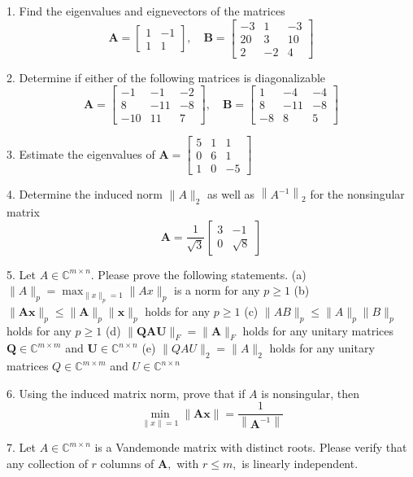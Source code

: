 \documentclass[a4paper,12pt,twoside]{ctexart}
\begin{document}
1. Find the eigenvalues and eignevectors of the matrices
$$
\bm{A}=\left[\begin{array}{cc}
1 & -1 \\
1 & 1
\end{array}\right], \quad \bm{B}=\left[\begin{array}{ccc}
-3 & 1 & -3 \\
20 & 3 & 10 \\
2 & -2 & 4
\end{array}\right]
$$

2. Determine if either of the following matrices is diagonalizable
$$
\bm{A}=\left[\begin{array}{ccc}
-1 & -1 & -2 \\
8 & -11 & -8 \\
-10 & 11 & 7
\end{array}\right], \quad \bm{B}=\left[\begin{array}{ccc}
1 & -4 & -4 \\
8 & -11 & -8 \\
-8 & 8 & 5
\end{array}\right]
$$

3. Estimate the eigenvalues of $\bm{A}=\left[\begin{array}{ccc}5 & 1 & 1 \\ 0 & 6 & 1 \\ 1 & 0 & -5\end{array}\right]$

4. Determine the induced norm $\|A\|_{2}$ as well as $\left\|A^{-1}\right\|_{2}$ for the nonsingular matrix
$$
\bm{A}=\frac{1}{\sqrt{3}}\left[\begin{array}{ll}
3 & -1 \\
0 & \sqrt{8}
\end{array}\right]
$$

5. Let $A \in \mathbb{C}^{m \times n}$. Please prove the following statements.
(a) $\|A\|_{p}=\max _{\|x\|_{p}=1}\|A x\|_{p}$ is a norm for any $p \geq 1$
(b) $\|\bm{A} \bm{x}\|_{p} \leq\|\bm{A}\|_{p}\|\bm{x}\|_{p}$ holds for any $p \geq 1$
(c) $\|A B\|_{p} \leq\|A\|_{p}\|B\|_{p}$ holds for any $p \geq 1$
(d) $\|\bm{Q} \bm{A} \bm{U}\|_{F}=\|\bm{A}\|_{F}$ holds for any unitary matrices $\bm{Q} \in \mathbb{C}^{m \times m}$ and $\bm{U} \in \mathbb{C}^{n \times n}$
(e) $\|Q A U\|_{2}=\|A\|_{2}$ holds for any unitary matrices $Q \in \mathbb{C}^{m \times m}$ and $U \in \mathbb{C}^{n \times n}$

6. Using the induced matrix norm, prove that if $A$ is nonsingular, then
$$
\min _{\|x\|=1}\|\bm{A} \bm{x}\|=\frac{1}{\left\|\bm{A}^{-1}\right\|}
$$

7. Let $A \in \mathbb{C}^{m \times n}$ is a Vandemonde matrix with distinct roots. Please verify that any collection of $r$ columns of $\bm{A},$ with $r \leq m,$ is linearly independent.
\end{document}
